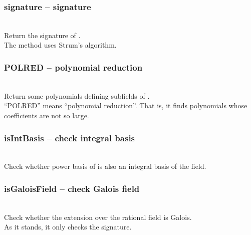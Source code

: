   \subsubsection{signature -- signature}
  \\
  \spacing
  \quad Return the signature of . \\
  \spacing
  \quad \negok The method uses Strum's algorithm.\\
%
  \subsubsection{POLRED -- polynomial reduction}
  \\
  \spacing
  \quad Return some polynomials defining subfields of . \\
  \spacing
  \quad \negok ``POLRED'' means ``polynomial reduction''. 
  That is, it finds polynomials whose coefficients are not so large.\\
%  
  \subsubsection{isIntBasis -- check integral basis}
  \\
  \spacing
  \quad Check whether power basis of  is also an integral basis of the field. \\
%  
  \subsubsection{isGaloisField -- check Galois field}
  \\
  \spacing
  \quad Check whether the extension  over the rational field is Galois. \\
  \quad \negok As it stands, it only checks the signature.\\
%  
